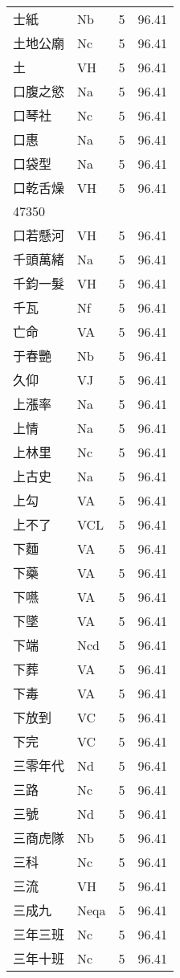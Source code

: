 \documentclass[twocolumn]{book}
\begin{document}
\begin{supertabular}{llrr}
士紙 & Nb & 5 &  96.41\\
土地公廟 & Nc & 5 &  96.41\\
土 & VH & 5 &  96.41\\
口腹之慾 & Na & 5 &  96.41\\
口琴社 & Nc & 5 &  96.41\\
口惠 & Na & 5 &  96.41\\
口袋型 & Na & 5 &  96.41\\
口乾舌燥 & VH & 5 &  96.41\\
47350\\
口若懸河 & VH & 5 &  96.41\\
千頭萬緒 & Na & 5 &  96.41\\
千鈞一髮 & VH & 5 &  96.41\\
千瓦 & Nf & 5 &  96.41\\
亡命 & VA & 5 &  96.41\\
于春艷 & Nb & 5 &  96.41\\
久仰 & VJ & 5 &  96.41\\
上漲率 & Na & 5 &  96.41\\
上情 & Na & 5 &  96.41\\
上林里 & Nc & 5 &  96.41\\
上古史 & Na & 5 &  96.41\\
上勾 & VA & 5 &  96.41\\
上不了 & VCL & 5 &  96.41\\
下麵 & VA & 5 &  96.41\\
下藥 & VA & 5 &  96.41\\
下嚥 & VA & 5 &  96.41\\
下墜 & VA & 5 &  96.41\\
下端 & Ncd & 5 &  96.41\\
下葬 & VA & 5 &  96.41\\
下毒 & VA & 5 &  96.41\\
下放到 & VC & 5 &  96.41\\
下完 & VC & 5 &  96.41\\
三零年代 & Nd & 5 &  96.41\\
三路 & Nc & 5 &  96.41\\
三號 & Nd & 5 &  96.41\\
三商虎隊 & Nb & 5 &  96.41\\
三科 & Nc & 5 &  96.41\\
三流 & VH & 5 &  96.41\\
三成九 & Neqa & 5 &  96.41\\
三年三班 & Nc & 5 &  96.41\\
三年十班 & Nc & 5 &  96.41\\

\end{supertabular}
\end{document}
